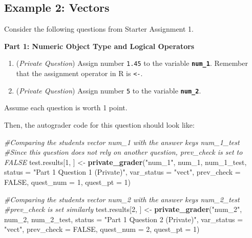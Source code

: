 \documentclass[
  12pt,
]{book}
\newenvironment{Shaded}{\begin{snugshade}}{\end{snugshade}}
\newcommand{\AttributeTok}[1]{\textcolor[rgb]{0.13,0.29,0.53}{#1}}
\newcommand{\CommentTok}[1]{\textcolor[rgb]{0.56,0.35,0.01}{\textit{#1}}}
\newcommand{\ConstantTok}[1]{\textcolor[rgb]{0.56,0.35,0.01}{#1}}
\newcommand{\DecValTok}[1]{\textcolor[rgb]{0.00,0.00,0.81}{#1}}
\newcommand{\FunctionTok}[1]{\textcolor[rgb]{0.13,0.29,0.53}{\textbf{#1}}}
\newcommand{\NormalTok}[1]{#1}
\newcommand{\OtherTok}[1]{\textcolor[rgb]{0.56,0.35,0.01}{#1}}
\newcommand{\StringTok}[1]{\textcolor[rgb]{0.31,0.60,0.02}{#1}}
\begin{document}
\subsection*{Example 2: Vectors}\label{example-2-vectors}

Consider the following questions from Starter Assignment 1.

\textbf{Part 1: Numeric Object Type and Logical Operators}

\begin{enumerate}
\def\labelenumi{\arabic{enumi}.}
\item
  (\emph{Private Question}) Assign number \texttt{1.45} to the variable \textbf{\texttt{num\_1}}. Remember that the assignment operator in R is \texttt{\textless{}-}.
\item
  (\emph{Private Question}) Assign number \texttt{5} to the variable \textbf{\texttt{num\_2}}.
\end{enumerate}

Assume each question is worth 1 point.

Then, the autograder code for this question should look like:

\begin{Shaded}
\begin{Highlighting}[]
\CommentTok{\#Comparing the student\textquotesingle{}s vector \textasciigrave{}num\_1\textasciigrave{} with the answer key\textquotesingle{}s \textasciigrave{}num\_1\_test\textasciigrave{} }
\CommentTok{\#Since this question does not rely on another question, \textasciigrave{}prev\_check\textasciigrave{} is set to \textasciigrave{}FALSE\textasciigrave{}}
\NormalTok{test.results[}\DecValTok{1}\NormalTok{, ] }\OtherTok{\textless{}{-}} \FunctionTok{private\_grader}\NormalTok{(}\StringTok{"num\_1"}\NormalTok{, num\_1, num\_1\_test,}
                                    \AttributeTok{status =} \StringTok{"Part 1 Question 1 (Private)"}\NormalTok{, }\AttributeTok{var\_status =} \StringTok{"vect"}\NormalTok{,}
                                    \AttributeTok{prev\_check =} \ConstantTok{FALSE}\NormalTok{, }\AttributeTok{quest\_num =} \DecValTok{1}\NormalTok{, }\AttributeTok{quest\_pt =} \DecValTok{1}\NormalTok{)}
  
\CommentTok{\#Comparing the student\textquotesingle{}s vector \textasciigrave{}num\_2\textasciigrave{} with the answer key\textquotesingle{}s \textasciigrave{}num\_2\_test\textasciigrave{} }
\CommentTok{\#\textasciigrave{}prev\_check\textasciigrave{} is set similarly}
\NormalTok{test.results[}\DecValTok{2}\NormalTok{, ] }\OtherTok{\textless{}{-}} \FunctionTok{private\_grader}\NormalTok{(}\StringTok{"num\_2"}\NormalTok{, num\_2, num\_2\_test,}
                                    \AttributeTok{status =} \StringTok{"Part 1 Question 2 (Private)"}\NormalTok{, }\AttributeTok{var\_status =} \StringTok{"vect"}\NormalTok{,}
                                    \AttributeTok{prev\_check =} \ConstantTok{FALSE}\NormalTok{, }\AttributeTok{quest\_num =} \DecValTok{2}\NormalTok{, }\AttributeTok{quest\_pt =} \DecValTok{1}\NormalTok{)}
\end{Highlighting}
\end{Shaded}
\end{document}
